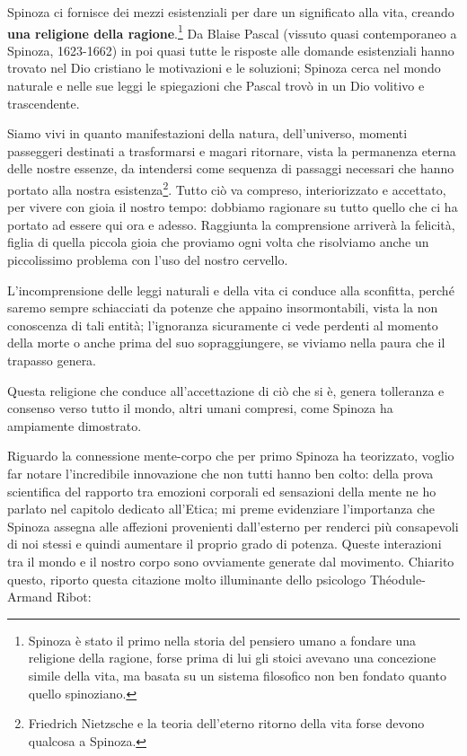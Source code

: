 Spinoza ci fornisce dei mezzi esistenziali per dare un significato alla vita, creando \textbf{una religione della ragione}.\footnote{Spinoza è stato il primo nella storia del pensiero umano a fondare una religione della ragione, forse prima di lui gli stoici avevano una concezione simile della vita, ma basata su un sistema filosofico non ben fondato quanto quello spinoziano.} Da Blaise Pascal (vissuto quasi contemporaneo a Spinoza, 1623-1662) in poi quasi tutte le risposte alle domande esistenziali hanno trovato nel Dio cristiano le motivazioni e le soluzioni; Spinoza cerca nel mondo naturale e nelle sue leggi le spiegazioni che Pascal trovò in un Dio volitivo e trascendente.

Siamo vivi in quanto manifestazioni della natura, dell'universo, momenti passeggeri destinati a trasformarsi e magari ritornare, vista la permanenza eterna delle nostre essenze, da intendersi come sequenza di passaggi necessari che hanno portato alla nostra esistenza\footnote{Friedrich Nietzsche e la teoria dell'eterno ritorno della vita forse devono qualcosa a Spinoza.}. Tutto ciò va compreso, interiorizzato e accettato, per vivere con gioia il nostro tempo: dobbiamo ragionare su tutto quello che ci ha portato ad essere qui ora e adesso. Raggiunta la comprensione arriverà la felicità, figlia di quella piccola gioia che proviamo ogni volta che risolviamo anche un piccolissimo problema con l'uso del nostro cervello.

L'incomprensione delle leggi naturali e della vita ci conduce alla sconfitta, perché saremo sempre schiacciati da potenze che appaino insormontabili, vista la non conoscenza di tali entità; l'ignoranza sicuramente ci vede perdenti al momento della morte o anche prima del suo sopraggiungere, se viviamo nella paura che il trapasso genera. 

Questa religione che conduce  all'accettazione di ciò che si è, genera tolleranza e consenso verso tutto il mondo, altri umani compresi, come Spinoza ha ampiamente dimostrato.

Riguardo la connessione mente-corpo che per primo Spinoza ha teorizzato, voglio far notare l'incredibile innovazione che non tutti hanno ben colto: della prova scientifica del rapporto tra emozioni corporali ed sensazioni della mente ne ho parlato nel capitolo dedicato all'Etica; mi preme evidenziare l'importanza che Spinoza assegna alle affezioni provenienti dall'esterno per renderci più consapevoli di noi stessi e quindi aumentare il proprio grado di potenza. Queste interazioni tra il mondo e il nostro corpo sono ovviamente generate dal movimento. Chiarito questo, riporto questa citazione molto illuminante dello psicologo Théodule-Armand Ribot: 

